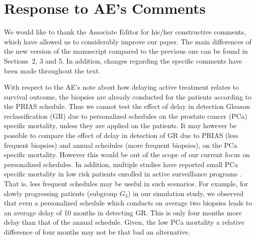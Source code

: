 \clearpage
\section*{Response to AE's Comments}
We would like to thank the Associate Editor for his/her constructive comments, which have allowed us to considerably improve our paper. The main differences of the new version of the manuscript compared to the previous one can be found in Sections~2, 3 and 5. In addition, changes regarding the specific comments have been made throughout the text.

With respect to the AE's note about how delaying active treatment relates to survival outcome, the biopsies are already conducted for the patients according to the PRIAS schedule. Thus we cannot test the effect of delay in detection Gleason reclassification (GR) due to personalized schedules on the prostate cancer (PCa) specific mortality, unless they are applied on the patients. It may however be possible to compare the effect of delay in detection of GR due to PRIAS (less frequent biopsies) and annual schedules (more frequent biopsies), on the PCa specific mortality. However this would be out of the scope of our current focus on personalized schedules. In addition, multiple studies have reported small PCa specific mortality in low risk patients enrolled in active surveillance programs \citep{loeb2016immediate,tosoian2011active,klotz2009clinical}. That is, less frequent schedules may be useful in such scenarios. For example, for slowly progressing patients (subgroup $G_3$) in our simulation study, we observed that even a personalized schedule which conducts on average two biopsies leads to an average delay of 10 months in detecting GR. This is only four months more delay than that of the annual schedule. Given, the low PCa mortality a relative difference of four months may not be that bad an alternative.
